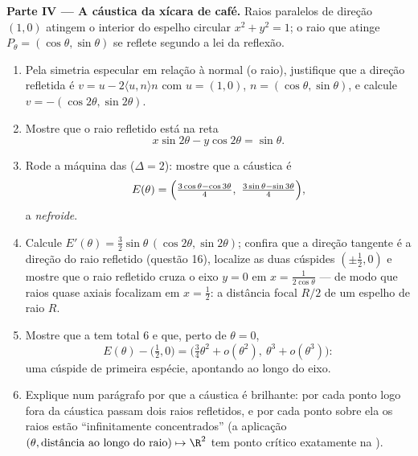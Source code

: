 \begin{problem}
\medskip
\noindent\textbf{Parte IV --- A cáustica da xícara de café.} Raios
paralelos de direção $(1, 0)$ atingem o interior do espelho
circular $x^2 + y^2 = 1$; o raio que atinge $P_\theta =
(\cos\theta, \sin\theta)$ se reflete segundo a lei da
reflexão.
\begin{enumerate}[resume]
  \item Pela simetria especular em relação à normal (o raio),
        justifique que a direção refletida é $v = u -
        2\langle u, n\rangle n$ com $u = (1,0)$, $n =
        (\cos\theta, \sin\theta)$, e calcule $v =
        -(\cos2\theta, \sin2\theta)$.
  \item Mostre que o raio refletido está na reta
        \[
        x\sin 2\theta - y\cos 2\theta = \sin\theta .
        \]
  \item Rode a máquina das  ($\Delta = 2$): mostre que
        a cáustica é
        \[
        E(\theta) = \Bigl(\tfrac{3\cos\theta -
        \cos3\theta}4,\ \tfrac{3\sin\theta -
        \sin3\theta}4\Bigr),
        \]
        a \emph{nefroide}.
  \item Calcule $E'(\theta) = \tfrac32\sin\theta\,
        (\cos2\theta, \sin2\theta)$; confira que a direção
        tangente é a direção do raio refletido (questão
        16), localize as duas cúspides $(\pm\tfrac12, 0)$ e
        mostre que o raio refletido cruza o eixo $y = 0$
        em $x = \frac1{2\cos\theta}$ --- de modo que raios quase axiais
        focalizam em $x = \tfrac12$: a distância focal $R/2$ de um
        espelho de raio $R$.
  \item Mostre que a  tem  total $6$ e que,
        perto de $\theta = 0$,
        \[
        E(\theta) - \bigl(\tfrac12, 0\bigr) =
        \bigl(\tfrac34\theta^2 + o(\theta^2),\ \theta^3 +
        o(\theta^3)\bigr) :
        \]
        uma cúspide de primeira espécie, apontando ao longo do eixo.
  \item Explique num parágrafo por que a cáustica é brilhante:
        por cada ponto logo fora da cáustica passam dois
        raios refletidos, e por cada ponto sobre ela os raios
        estão ``infinitamente concentrados'' (a aplicação $(\theta,
        \text{distância ao longo do raio}) \mapsto \R^2$ tem
        ponto crítico exatamente na ).
\end{enumerate}


\end{problem}
